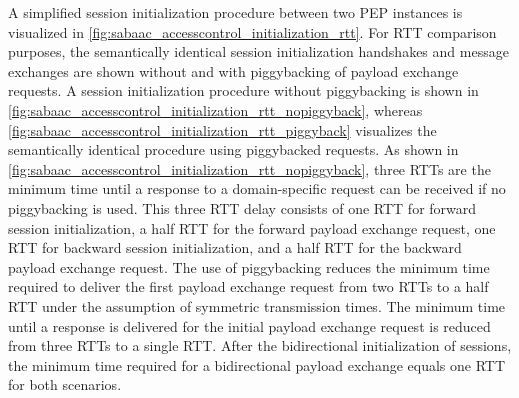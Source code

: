 \begin{description}
    A simplified session initialization procedure between two PEP instances is visualized in \autoref{fig:sabaac_accesscontrol_initialization_rtt}.
    For RTT comparison purposes, the semantically identical session initialization handshakes and message exchanges are shown without and with piggybacking of payload exchange requests.
    A session initialization procedure without piggybacking is shown in \autoref{fig:sabaac_accesscontrol_initialization_rtt_nopiggyback}, whereas \autoref{fig:sabaac_accesscontrol_initialization_rtt_piggyback} visualizes the semantically identical procedure using piggybacked requests.
    As shown in \autoref{fig:sabaac_accesscontrol_initialization_rtt_nopiggyback}, three RTTs are the minimum time until a response to a domain-specific request can be received if no piggybacking is used.
    This three RTT delay consists of one RTT for forward session initialization, a half RTT for the forward payload exchange request, one RTT for backward session initialization, and a half RTT for the backward payload exchange request.
    The use of piggybacking reduces the minimum time required to deliver the first payload exchange request from two RTTs to a half RTT under the assumption of symmetric transmission times.
    The minimum time until a response is delivered for the initial payload exchange request is reduced from three RTTs to a single RTT.
    After the bidirectional initialization of sessions, the minimum time required for a bidirectional payload exchange equals one RTT for both scenarios.
    \begin{figure}
        \centering
        \begin{subfigure}[t]{0.48\linewidth}
            \centering

\end{subfigure}
\end{figure}
\end{description}

